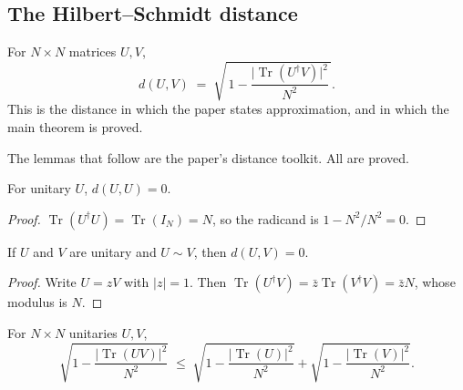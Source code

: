 \subsection{The Hilbert--Schmidt distance}

\begin{definition}
  \label{def:hs_distance}
  \leanok
  For $N \times N$ matrices $U, V$,
  \[
    d(U,V) \;=\; \sqrt{\,1 - \frac{\lvert \operatorname{Tr}(U^\dagger V)
      \rvert^2}{N^2}\,}.
  \]
  This is the distance in which the paper states approximation, and in which
  the main theorem is proved.
\end{definition}

The lemmas that follow are the paper's distance toolkit.  All are proved.

\begin{lemma}
  \label{lem:hs_self}
  \leanok
  For unitary $U$, $d(U,U) = 0$.
\end{lemma}

\begin{proof}
  \leanok
  $\operatorname{Tr}(U^\dagger U) = \operatorname{Tr}(I_N) = N$, so the
  radicand is $1 - N^2/N^2 = 0$.
\end{proof}

\begin{lemma}
  \label{lem:hs_phase}
  \leanok
  If $U$ and $V$ are unitary and $U \sim V$, then $d(U,V) = 0$.
\end{lemma}

\begin{proof}
  \leanok
  Write $U = z V$ with $\lvert z \rvert = 1$.  Then
  $\operatorname{Tr}(U^\dagger V) = \bar{z}\operatorname{Tr}(V^\dagger V)
   = \bar{z} N$, whose modulus is $N$.
\end{proof}

\begin{lemma}
  \label{lem:hs_trace_ineq}
  \leanok
  For $N \times N$ unitaries $U, V$,
  \[
    \sqrt{1 - \frac{\lvert\operatorname{Tr}(UV)\rvert^2}{N^2}}
      \;\le\;
    \sqrt{1 - \frac{\lvert\operatorname{Tr}(U)\rvert^2}{N^2}}
      +
    \sqrt{1 - \frac{\lvert\operatorname{Tr}(V)\rvert^2}{N^2}}.
  \]
\end{lemma}

